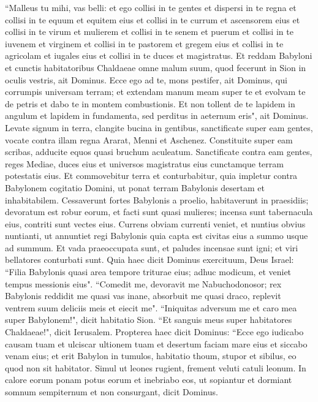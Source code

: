 \begin{biblechapter}
\verse “Malleus tu mihi, vas belli: et ego collisi in te gentes et dispersi in te regna 
\verse et collisi in te equum et equitem eius et collisi in te currum et ascensorem eius 
\verse et collisi in te virum et mulierem et collisi in te senem et puerum et collisi in te iuvenem et virginem 
\verse et collisi in te pastorem et gregem eius et collisi in te agricolam et iugales eius et collisi in te duces et magistratus. 
\verse Et reddam Babyloni et cunctis habitatoribus Chaldaeae omne malum suum, quod fecerunt in Sion in oculis vestris, ait Dominus. 
\verse Ecce ego ad te, mons pestifer, ait Dominus, qui corrumpis universam terram; et extendam manum meam super te et evolvam te de petris et dabo te in montem combustionis. 
\verse Et non tollent de te lapidem in angulum et lapidem in fundamenta, sed perditus in aeternum eris", ait Dominus. 
\verse Levate signum in terra, clangite bucina in gentibus, sanctificate super eam gentes, vocate contra illam regna Ararat, Menni et Aschenez. Constituite super eam scribas, adducite equos quasi bruchum aculeatum. 
\verse Sanctificate contra eam gentes, reges Mediae, duces eius et universos magistratus eius cunctamque terram potestatis eius. 
\verse Et commovebitur terra et conturbabitur, quia impletur contra Babylonem cogitatio Domini, ut ponat terram Babylonis desertam et inhabitabilem. 
\verse Cessaverunt fortes Babylonis a proelio, habitaverunt in praesidiis; devoratum est robur eorum, et facti sunt quasi mulieres; incensa sunt tabernacula eius, contriti sunt vectes eius. 
\verse Currens obviam currenti veniet, et nuntius obvius nuntianti, ut annuntiet regi Babylonis quia capta est civitas eius a summo usque ad summum. 
\verse Et vada praeoccupata sunt, et paludes incensae sunt igni; et viri bellatores conturbati sunt. 
\verse Quia haec dicit Dominus exercituum, Deus Israel: “Filia Babylonis quasi area tempore triturae eius; adhuc modicum, et veniet tempus messionis eius". 
\verse “Comedit me, devoravit me Nabuchodonosor; rex Babylonis reddidit me quasi vas inane, absorbuit me quasi draco, replevit ventrem suum deliciis meis et eiecit me". 
\verse “Iniquitas adversum me et caro mea super Babylonem!", dicit habitatio Sion. “Et sanguis meus super habitatores Chaldaeae!", dicit Ierusalem. 
\verse Propterea haec dicit Dominus: “Ecce ego iudicabo causam tuam et ulciscar ultionem tuam et desertum faciam mare eius et siccabo venam eius; 
\verse et erit Babylon in tumulos, habitatio thoum, stupor et sibilus, eo quod non sit habitator. 
\verse Simul ut leones rugient, frement veluti catuli leonum. 
\verse In calore eorum ponam potus eorum et inebriabo eos, ut sopiantur et dormiant somnum sempiternum et non consurgant, dicit Dominus. 

\end{biblechapter}
